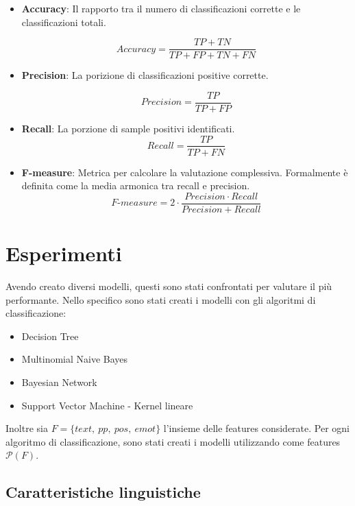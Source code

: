 \documentclass[oneside]{book}
\begin{document}
\begin{itemize}
	\item \textbf{Accuracy}: Il rapporto tra il numero di classificazioni corrette e le classificazioni totali.
	
	$$Accuracy = \frac{TP + TN}{TP + FP + TN + FN} $$
	
	\item \textbf{Precision}: La porizione di classificazioni positive corrette.
	
	$$Precision = \frac{TP}{TP + FP} $$
		
	\item \textbf{Recall}: La porzione di sample positivi identificati.
	$$Recall = \frac{TP}{TP + FN} $$
	
	
	\item \textbf{F-measure}: Metrica per calcolare la valutazione complessiva. Formalmente è definita come la media armonica tra recall e precision.
	$$F\text{-}measure =  2 \cdot \frac{Precision \cdot Recall}{Precision + Recall} $$
	
\end{itemize}

\section{Esperimenti}
Avendo creato diversi modelli, questi sono stati confrontati per valutare il più performante. Nello specifico sono stati creati i modelli con gli algoritmi di classificazione:
\begin{itemize}
	\item Decision Tree
	\item Multinomial Naive Bayes
	\item Bayesian Network
	\item Support Vector Machine - Kernel lineare
\end{itemize}
Inoltre sia $F = \{text,\ pp,\ pos,\ emot\}$ l'insieme delle features considerate. Per ogni algoritmo di classificazione, sono stati creati i modelli utilizzando come features $\mathscr{P}(F)$.

\newpage
\subsection{Caratteristiche linguistiche}
\end{document}
